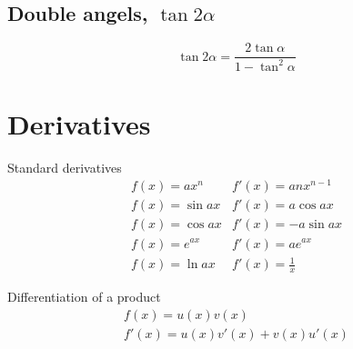 \documentclass[a4paper, 10pt]{scrartcl}
\begin{document}
\subsection{Double angels, $\tan{2\alpha}$}
\[\tan{2\alpha} = \frac{2\tan{\alpha}}{1 - \tan^{2}{\alpha}}\]

\section{Derivatives}

Standard derivatives
\begin{eqnarray}
f(x) = ax^{n} & f'(x) = anx^{n - 1}\\
f(x) = \sin{ax} & f'(x) = a\cos{ax}\\
f(x) = \cos{ax} & f'(x) = -a\sin{ax}\\
f(x) = e^{ax} & f'(x) = ae^{ax}\\
f(x) = \ln{ax} & f'(x) = \frac{1}{x}
\end{eqnarray}

Differentiation of a product
\begin{eqnarray}
f(x) = u(x)v(x)\\
f'(x) = u(x)v'(x) + v(x)u'(x)\\
\end{eqnarray}
\end{document}
